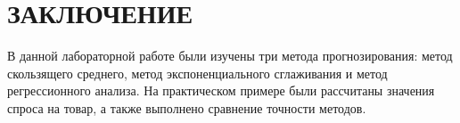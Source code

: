 \section*{ЗАКЛЮЧЕНИЕ}

В данной лабораторной работе были изучены три метода прогнозирования:
метод скользящего среднего, метод экспоненциального сглаживания
и метод регрессионного анализа.
На практическом примере были рассчитаны значения спроса на товар,
а также выполнено сравнение точности методов.
